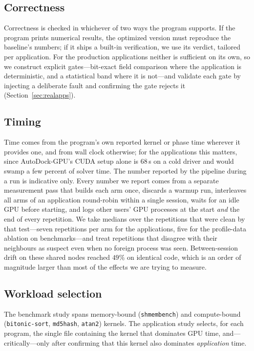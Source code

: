 \subsection{Correctness}
Correctness is checked in whichever of two ways the program supports. If the program prints numerical
results, the optimized version must reproduce the baseline's numbers; if it ships a built-in
verification, we use its verdict, tailored per application. For the production applications neither is
sufficient on its own, so we construct explicit gates---bit-exact field comparison where the
application is deterministic, and a statistical band where it is not---and validate each gate by
injecting a deliberate fault and confirming the gate rejects it (Section~\ref{sec:realapps}).

\subsection{Timing}
Time comes from the program's own reported kernel or phase time wherever it provides one, and from wall
clock otherwise; for the applications this matters, since AutoDock-GPU's CUDA setup alone is $68$\,s on
a cold driver and would swamp a few percent of solver time. The number reported by the pipeline during
a run is indicative only. Every number we report comes from a separate measurement pass that builds
each arm once, discards a warmup run, interleaves all arms of an application round-robin within a
single session, waits for an idle GPU before starting, and logs other users' GPU processes at the start
\emph{and} the end of every repetition. We take medians over the repetitions that were clean by that
test---seven repetitions per arm for the applications, five for the profile-data ablation on
benchmarks---and treat repetitions that disagree with their neighbours as suspect even when no foreign
process was seen. Between-session drift on these shared nodes reached $49\%$ on identical code, which
is an order of magnitude larger than most of the effects we are trying to measure.

\subsection{Workload selection}
The benchmark study spans memory-bound (\texttt{shmembench}) and compute-bound (\texttt{bitonic-sort},
\texttt{md5hash}, \texttt{atan2}) kernels. The application study selects, for each program, the single
file containing the kernel that dominates GPU time, and---critically---only after confirming that this
kernel also dominates \emph{application} time.
